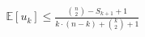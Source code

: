 \documentclass[preview]{standalone}
\begin{document}
\begin{align*}
\mathbb{E}[u_k] \leq \frac{\binom{n}{2} - S_{k+1} + 1}{k \cdot (n-k)+\binom{k}{2}+1}
\end{align*}
\end{document}
